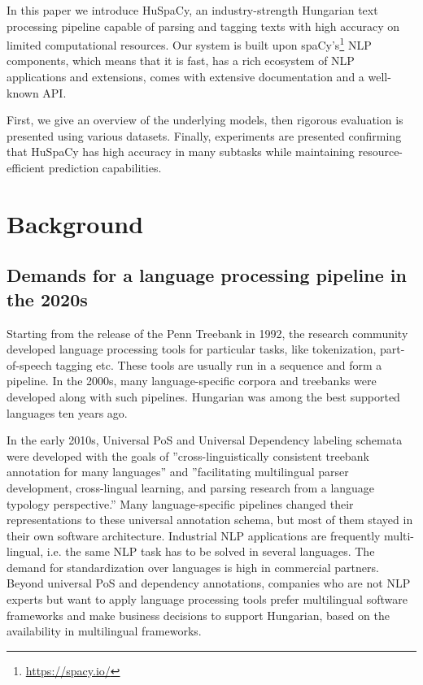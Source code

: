 \documentclass{llncs}
\newcommand{\spacy}{spaCy}
\newcommand{\huspacy}{HuSpaCy}
\begin{document}
In this paper we introduce \huspacy, an industry-strength Hungarian text processing pipeline capable of parsing and tagging texts with high accuracy on limited computational resources. Our system is built upon \spacy’s\footnote{\url{https://spacy.io/}} NLP components, which means that it is fast, has a rich ecosystem of NLP applications and extensions, comes with extensive documentation and a well-known API. 

First, we give an overview of the underlying models, then rigorous evaluation is presented using various datasets. Finally, experiments are presented confirming that \huspacy{} has high accuracy in many subtasks while maintaining resource-efficient prediction capabilities.

\section{Background}

\subsection{Demands for a language processing pipeline in the 2020s}
Starting from the release of the Penn Treebank \citep{penntreebank} in 1992, the research community developed language processing tools for particular tasks, like tokenization, part-of-speech tagging etc. These tools are usually run in a sequence and form a pipeline. In the 2000s, many language-specific corpora and treebanks were developed along with such pipelines. Hungarian was among the best supported languages \citep{metanet} ten years ago.

In the early 2010s, Universal PoS \citep{udpos} and Universal Dependency \citep{univedepv1} labeling schemata were developed with the goals of ''cross-linguistically consistent treebank annotation for many languages'' and ''facilitating multilingual parser development, cross-lingual learning, and parsing research from a language typology perspective.'' Many language-specific pipelines changed their representations to these universal annotation schema, but most of them stayed in their own software architecture. Industrial NLP applications are frequently multi-lingual, i.e. the same NLP task has to be solved in several languages. The demand for standardization over languages is high in commercial partners. Beyond universal PoS and dependency annotations, companies who are not NLP experts but want to apply language processing tools prefer multilingual software frameworks and make business decisions to support Hungarian, based on the availability in multilingual frameworks.
\end{document}
